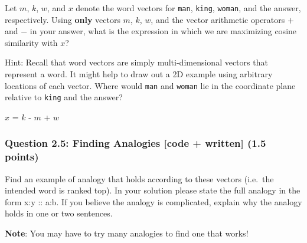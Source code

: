 \documentclass[11pt]{article}
\begin{document}
    Let \(m\), \(k\), \(w\), and \(x\) denote the word vectors for
\texttt{man}, \texttt{king}, \texttt{woman}, and the answer,
respectively. Using \textbf{only} vectors \(m\), \(k\), \(w\), and the
vector arithmetic operators \(+\) and \(-\) in your answer, what is the
expression in which we are maximizing cosine similarity with \(x\)?

Hint: Recall that word vectors are simply multi-dimensional vectors that
represent a word. It might help to draw out a 2D example using arbitrary
locations of each vector. Where would \texttt{man} and \texttt{woman}
lie in the coordinate plane relative to \texttt{king} and the answer?

    \(x\) = \(k\) - \(m\) + \(w\)

    \hypertarget{question-2.5-finding-analogies-code-written-1.5-points}{%
\subsubsection{Question 2.5: Finding Analogies {[}code + written{]} (1.5
points)}\label{question-2.5-finding-analogies-code-written-1.5-points}}

Find an example of analogy that holds according to these vectors
(i.e.~the intended word is ranked top). In your solution please state
the full analogy in the form x:y :: a:b. If you believe the analogy is
complicated, explain why the analogy holds in one or two sentences.

\textbf{Note}: You may have to try many analogies to find one that
works!
\end{document}
